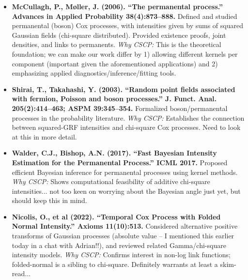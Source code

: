 \documentclass[11pt]{article}
\begin{document}
	\begin{itemize}
		\item \textbf{McCullagh, P., Møller, J. (2006). ``The permanental process.'' Advances in Applied Probability 38(4):873--888.}  
		Defined and studied permanental (boson) Cox processes, with intensities given by sums of squared Gaussian fields (chi-square distributed). Provided existence proofs, joint densities, and links to permanents.  
		\emph{Why CSCP:} This is the theoretical foundation; we can make our work differ by 1) allowing different kernels per component (important given the aforementioned applications) and 2) emphasizing applied diagnostics/inference/fitting tools.
		
		\item \textbf{Shirai, T., Takahashi, Y. (2003). ``Random point fields associated with fermion, Poisson and boson processes.'' J. Funct. Anal. 205(2):414--463; ASPM 39:345--354.}  
		Formalized boson/permanental processes in the probability literature.  
		\emph{Why CSCP:} Establishes the connection between squared-GRF intensities and chi-square Cox processes. Need to look at this in more detail.
		
		\item \textbf{Walder, C.J., Bishop, A.N. (2017). ``Fast Bayesian Intensity Estimation for the Permanental Process.'' ICML 2017.}  
		Proposed efficient Bayesian inference for permanental processes using kernel methods.  
		\emph{Why CSCP:} Shows computational feasibility of additive chi-square intensities... not too keen on worrying about the Bayesian angle just yet, but should keep this in mind.
		
		\item \textbf{Nicolis, O., et al (2022). ``Temporal Cox Process with Folded Normal Intensity.'' Axioms 11(10):513.}  
		Considered alternative positive transforms of Gaussian processes (absolute value -- I mentioned this earlier today in a chat with Adrian!!), and reviewed related Gamma/chi-square intensity models.  
		\emph{Why CSCP:} Confirms interest in non-log link functions; folded-normal is a sibling to chi-square. Definitely warrants at least a skim-read...
	\end{itemize}
	
\end{document}
